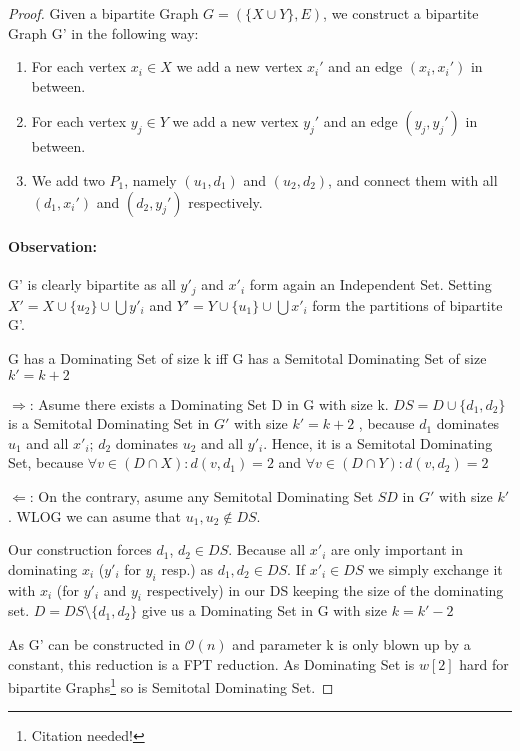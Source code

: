 \begin{proof}
    Given a bipartite Graph $G = ( \{X \cup Y\}, E)$, we construct a bipartite Graph G' in the following way:
    \begin{enumerate}
        \item For each vertex $x_i \in X$ we add a new vertex $x_i'$  and an edge $(x_i, x_i')$ in between.
        \item For each vertex $y_j \in Y$ we add a new vertex $y_j'$ and an edge $(y_j, y_j')$ in between.
        \item We add two $P_1$, namely $(u_1, d_1)$ and $(u_2, d_2)$, and connect them with all $(d_1, x_i')$ and $(d_2, y_j')$ respectively.
    \end{enumerate}
    \paragraph*{Observation:} G' is clearly bipartite as all $y'_j$ and $x'_i$ form again an Independent Set. Setting  $X' = X \cup \{u_2\} \cup \bigcup y'_i$ and $Y' = Y \cup \{u_1\} \cup \bigcup {x'_i}$ form the partitions of bipartite G'.

    \begin{corollary} G has a Dominating Set of size k iff G has a Semitotal Dominating Set of size $k' = k + 2$
    \end{corollary} 
    $\Rightarrow$: Asume there exists a Dominating Set D in G with size k. $DS = D\cup \{d_1,d_2\}$ is a Semitotal Dominating Set in $G'$ with size $k' = k+2 $ , because $d_1$ dominates $u_1$ and all $x'_i$; $d_2$ dominates $u_2$ and all $y'_i$. Hence, it is a Semitotal Dominating Set, because $\forall v \in (D \cap X): d(v, d_1) = 2$ and $\forall v \in (D \cap Y): d(v, d_2) = 2$

    $\Leftarrow$: On the contrary, asume any Semitotal Dominating Set $SD$ in $G'$ with size $k'$. WLOG we can asume that $u_1, u_2 \notin DS$. 
    
    Our construction forces $d_1$, $d_2 \in DS$. Because all $x'_i$ are only important in dominating $x_i$ ($y'_i$ for $y_i$ resp.) as $d_1, d_2 \in DS$. If $x'_i \in DS$ we simply exchange it with $x_i$ (for $y'_i$ and $y_i$ respectively) in our DS keeping the size of the dominating set. $D = DS \setminus \{ d_1,d_2\}$ give us a Dominating Set in G with size $ k = k' - 2$

    As G' can be constructed in $\mathcal{O}(n)$ and parameter k is only blown up by a constant, this reduction is a FPT reduction. As Dominating Set is $w[2]$ hard for bipartite Graphs\footnote{Citation needed!} so is Semitotal Dominating Set.
\end{proof}
